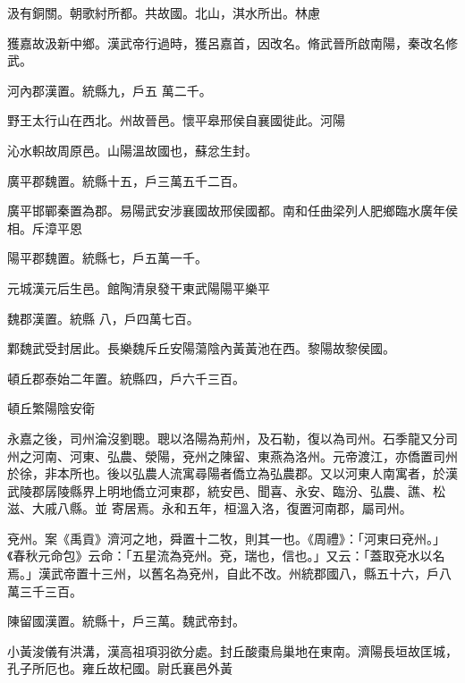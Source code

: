 \begin{pinyinscope}
 汲有銅關。朝歌紂所都。共故國。北山，淇水所出。林慮



 獲嘉故汲新中鄉。漢武帝行過時，獲呂嘉首，因改名。脩武晉所啟南陽，秦改名修武。



 河內郡漢置。統縣九，戶五
 萬二千。



 野王太行山在西北。州故晉邑。懷平皋邢侯自襄國徙此。河陽



 沁水軹故周原邑。山陽溫故國也，蘇忿生封。



 廣平郡魏置。統縣十五，戶三萬五千二百。



 廣平邯鄲秦置為郡。易陽武安涉襄國故邢侯國都。南和任曲梁列人肥鄉臨水廣年侯相。斥漳平恩



 陽平郡魏置。統縣七，戶五萬一千。



 元城漢元后生邑。館陶清泉發干東武陽陽平樂平



 魏郡漢置。統縣
 八，戶四萬七百。



 鄴魏武受封居此。長樂魏斥丘安陽蕩陰內黃黃池在西。黎陽故黎侯國。



 頓丘郡泰始二年置。統縣四，戶六千三百。



 頓丘繁陽陰安衛



 永嘉之後，司州淪沒劉聰。聰以洛陽為荊州，及石勒，復以為司州。石季龍又分司州之河南、河東、弘農、滎陽，兗州之陳留、東燕為洛州。元帝渡江，亦僑置司州於徐，非本所也。後以弘農人流寓尋陽者僑立為弘農郡。又以河東人南寓者，於漢武陵郡孱陵縣界上明地僑立河東郡，統安邑、聞喜、永安、臨汾、弘農、譙、松滋、大戚八縣。並
 寄居焉。永和五年，桓溫入洛，復置河南郡，屬司州。



 兗州。案《禹貢》濟河之地，舜置十二牧，則其一也。《周禮》：「河東曰兗州。」《春秋元命包》云命：「五星流為兗州。兗，瑞也，信也。」又云：「蓋取兗水以名焉。」漢武帝置十三州，以舊名為兗州，自此不改。州統郡國八，縣五十六，戶八萬三千三百。



 陳留國漢置。統縣十，戶三萬。魏武帝封。



 小黃浚儀有洪溝，漢高祖項羽欲分處。封丘酸棗烏巢地在東南。濟陽長垣故匡城，孔子所厄也。雍丘故杞國。尉氏襄邑外黃




\end{pinyinscope}

